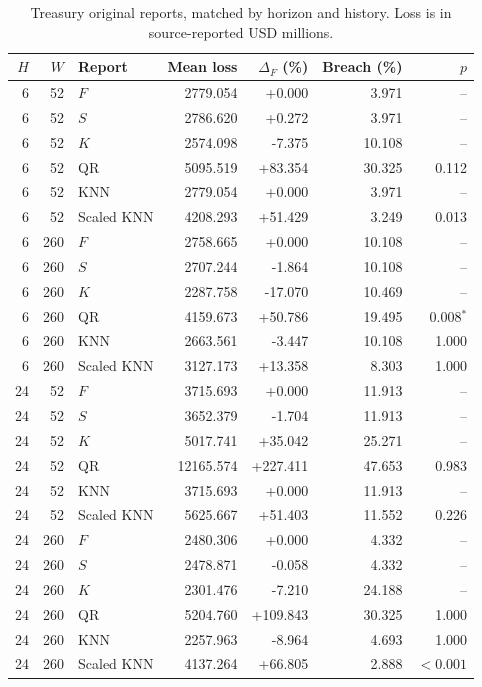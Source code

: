 \begin{table}[!htbp]
\centering\small
\caption{Treasury original reports, matched by horizon and history. Loss is in source-reported USD millions.}\label{tab:treasury}
\begin{tabular}{rrlrrrr}
\toprule
$H$ & $W$ & Report & Mean loss & $\Delta_F$ (\%) & Breach (\%) & $p$ \\
\midrule
6 & 52 & $F$ & 2779.054 & +0.000 & 3.971 & -- \\
6 & 52 & $S$ & 2786.620 & +0.272 & 3.971 & -- \\
6 & 52 & $K$ & 2574.098 & -7.375 & 10.108 & -- \\
6 & 52 & QR & 5095.519 & +83.354 & 30.325 & 0.112 \\
6 & 52 & KNN & 2779.054 & +0.000 & 3.971 & -- \\
6 & 52 & Scaled KNN & 4208.293 & +51.429 & 3.249 & 0.013 \\
6 & 260 & $F$ & 2758.665 & +0.000 & 10.108 & -- \\
6 & 260 & $S$ & 2707.244 & -1.864 & 10.108 & -- \\
6 & 260 & $K$ & 2287.758 & -17.070 & 10.469 & -- \\
6 & 260 & QR & 4159.673 & +50.786 & 19.495 & 0.008$^{*}$ \\
6 & 260 & KNN & 2663.561 & -3.447 & 10.108 & 1.000 \\
6 & 260 & Scaled KNN & 3127.173 & +13.358 & 8.303 & 1.000 \\
24 & 52 & $F$ & 3715.693 & +0.000 & 11.913 & -- \\
24 & 52 & $S$ & 3652.379 & -1.704 & 11.913 & -- \\
24 & 52 & $K$ & 5017.741 & +35.042 & 25.271 & -- \\
24 & 52 & QR & 12165.574 & +227.411 & 47.653 & 0.983 \\
24 & 52 & KNN & 3715.693 & +0.000 & 11.913 & -- \\
24 & 52 & Scaled KNN & 5625.667 & +51.403 & 11.552 & 0.226 \\
24 & 260 & $F$ & 2480.306 & +0.000 & 4.332 & -- \\
24 & 260 & $S$ & 2478.871 & -0.058 & 4.332 & -- \\
24 & 260 & $K$ & 2301.476 & -7.210 & 24.188 & -- \\
24 & 260 & QR & 5204.760 & +109.843 & 30.325 & 1.000 \\
24 & 260 & KNN & 2257.963 & -8.964 & 4.693 & 1.000 \\
24 & 260 & Scaled KNN & 4137.264 & +66.805 & 2.888 & $<0.001$ \\

\end{tabular}
\end{table}
